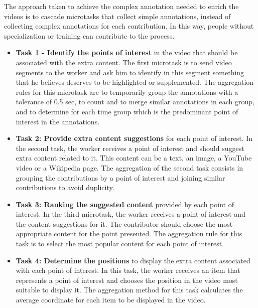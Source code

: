 The approach taken to achieve the complex annotation needed to enrich the videos is to cascade microtasks that collect simple annotations, instead of collecting complex annotations for each contribution. In this way, people without specialization or training can contribute to the process.


\begin{itemize}
\item \textbf{Task 1 - Identify the points of interest} in the video that should be associated with the extra content. The first microtask is to send video segments to the worker and ask him to identify in this segment something that he believes deserves to be highlighted or supplemented. The aggregation rules for this microtask are to temporarily group the annotations with a tolerance of 0.5 sec, to count and to merge similar annotations in each group, and to determine for each time group which is the predominant point of interest in the annotations.

\item \textbf{Task 2: Provide extra content suggestions} for each point of interest. In the second task, the worker receives a point of interest and should suggest extra content related to it. This content can be a text, an image, a YouTube video or a Wikipedia page. The aggregation of the second task consists in grouping the contributions by a point of interest and joining similar contributions to avoid duplicity.

\item \textbf{Task 3: Ranking the suggested content} provided by each point of interest. In the third microtask, the worker receives a point of interest and the content suggestions for it. The contributor should choose the most appropriate content for the point presented. The aggregation rule for this task is to select the most popular content for each point of interest.

	
\item \textbf{Task 4: Determine the positions} to display the extra content associated with each point of interest. In this task, the worker receives an item that represents a point of interest and chooses the position in the video most suitable to display it. The aggregation method for this task calculates the average coordinate for each item to be displayed in the video.

\end{itemize}



